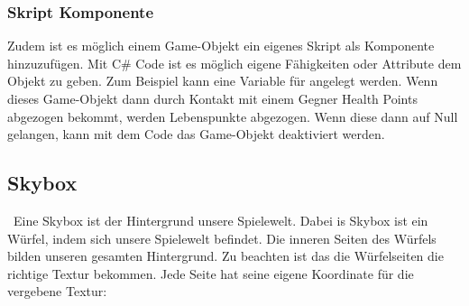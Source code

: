 \pagebreak
{}

\subsubsection{Skript Komponente}
Zudem ist es möglich einem Game-Objekt ein eigenes Skript als Komponente hinzuzufügen. Mit C\# Code ist es möglich eigene Fähigkeiten oder Attribute dem Objekt zu geben. Zum Beispiel kann eine Variable für  angelegt werden. Wenn dieses Game-Objekt dann durch Kontakt mit einem Gegner Health Points abgezogen bekommt, werden Lebenspunkte abgezogen. Wenn diese dann auf Null gelangen, kann mit dem Code das Game-Objekt deaktiviert werden.


\subsection{Skybox}\
Eine Skybox ist der Hintergrund unsere Spielewelt. Dabei is Skybox ist ein Würfel, indem sich unsere Spielewelt befindet. Die inneren Seiten des Würfels bilden unseren gesamten Hintergrund.
Zu beachten ist das die Würfelseiten die richtige Textur bekommen. Jede Seite hat seine eigene Koordinate für die vergebene Textur:\\\\

